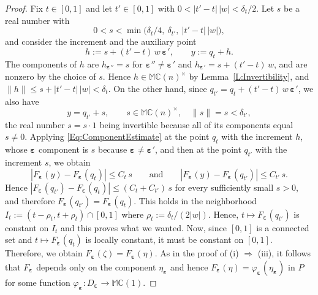 \documentclass[10pt,a4paper]{amsart}
\newcommand{\Ra}{\Rightarrow}
\newcommand{\bep}[1]{\bm{\varepsilon_{#1}}}
\newcommand{\mC}{\mathbb{C}}
\newcommand{\mM}{\mathbb{M}}
\newcommand{\ra}{\rightarrow}
\begin{document}
\begin{proof}
    Fix $t \in [ 0 , 1 ]$ and let $t ' \in [ 0 , 1 ]$ with
    $0 < | t ' - t |\, | w | < \delta_t / 2$. Let $s$ be a real number with
        \[
        0 < s < \min \big( \delta_t / 4 ,\ \delta_{t '} ,\
        | t ' - t |\, | w | \big) ,
        \]
    and consider the increment and the auxiliary point
        \[
        h := s + ( t ' - t )\, w\, \bep{}' , \qquad y := q_t + h .
        \]
    The components of $h$ are $h_{\bep{}''} = s$ for $\bep{}'' \neq \bep{}'$ and
    $h_{\bep{}'} = s + ( t ' - t )\, w$, and are nonzero by the choice of $s$. Hence $h \in \mM \mC(n)^\times$ by
    Lemma~\ref{L:Invertibility}, and
    $\| h \| \leq s + | t ' - t |\, | w | < \delta_t$. On the other hand,
    since $q_{t '} = q_t + ( t ' - t )\, w\, \bep{}'$, we also have
        \[
        y = q_{t '} + s , \qquad s \in \mM \mC(n)^\times , \quad
        \| s \| = s < \delta_{t '} ,
        \]
    the real number $s = s \cdot 1$ being invertible because all of its
    components equal $s \neq 0$. Applying \eqref{Eq:ComponentEstimate} at the
    point $q_t$ with the increment $h$, whose $\bep{}$ component is $s$ because
    $\bep{} \neq \bep{}'$, and then at the point $q_{t '}$ with the increment $s$, we
    obtain
        \[
        | F_{\bep{}} ( y ) - F_{\bep{}} ( q_t ) | \leq C_t\, s
        \qquad \text{and} \qquad
        | F_{\bep{}} ( y ) - F_{\bep{}} ( q_{t '} ) | \leq C_{t '}\, s .
        \]
    Hence $| F_{\bep{}} ( q_{t '} ) - F_{\bep{}} ( q_t ) | \leq ( C_t + C_{t '} )\, s$ for
    every sufficiently small $s > 0$, and therefore
    $F_{\bep{}} ( q_{t '} ) = F_{\bep{}} ( q_t )$. This holds in the neighborhood $I_t := (t - \rho_t , t + \rho_t) \cap [0, 1]$ where $\rho_t := \delta_t / (2 |w| )$. Hence, $t\mapsto F_{\bep{}}(q_{t'})$ is constant on $I_t$ and this proves what we wanted. Now, since $[0, 1]$ is a connected set and $t \mapsto F_{\bep{}} ( q_t )$ is locally constant, it must be constant on $[0, 1]$. Therefore, we obtain $F_{\bep{}} ( \zeta ) = F_{\bep{}} ( \eta )$. As in the proof of (i) $\Ra$ (iii), it follows that $F_{\bep{}}$ depends only on the component $\eta_{\bep{}}$ and hence $F_{\bep{}} ( \eta ) = \varphi_{\bep{}} ( \eta_{\bep{}} )$ in $P$ for some function $\varphi_{\bep{}} : D_{\bep{}} \ra \mM \mC(1)$.


\end{proof}
\end{document}
